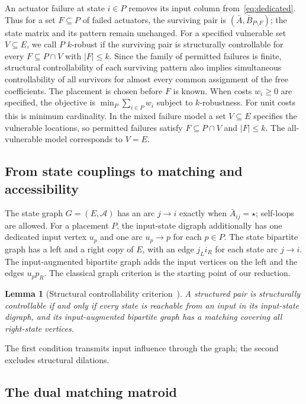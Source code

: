 \documentclass[11pt]{article}
\newtheorem{lemma}[theorem]{Lemma}
\theoremstyle{definition}
\theoremstyle{remark}\newtheorem{remark}[theorem]{Remark}
\begin{document}
An actuator failure at state $i\in P$ removes its input column
from~\eqref{eq:dedicated}. Thus for a set $F\subseteq P$ of
failed actuators, the surviving pair is
$(\bar A,\bar B_{P\setminus F})$; the state matrix and its
pattern remain unchanged. For a specified vulnerable set $V\subseteq E$, we call $P$
$k$-robust if the surviving pair is structurally controllable for
every $F\subseteq P\cap V$ with $|F|\le k$. Since the family of permitted failures is
finite, structural controllability of each surviving pattern
also implies simultaneous controllability of all survivors
for almost every common assignment of the free coefficients.
The placement is chosen before $F$ is known. When costs
$w_i\ge0$ are specified, the objective is
$\min_{P}\sum_{i\in P}w_i$ subject to $k$-robustness.
For unit costs this is minimum cardinality. In the mixed
failure model a set $V\subseteq E$ specifies the vulnerable locations,
so permitted failures satisfy $F\subseteq P\cap V$ and $|F|\le k$.
The all-vulnerable model corresponds to $V=E$.

\subsection{From state couplings to matching and accessibility}
The state graph $G=(E,\mathcal A)$ has an arc $j\to i$
exactly when $\bar A_{ij}=\star$; self-loops are allowed.
For a placement $P$, the input-state digraph additionally
has one dedicated input vertex $u_p$ and one arc $u_p\to p$
for each $p\in P$. The state bipartite graph has a left and a
right copy of $E$, with an edge $j_L i_R$ for each state arc
$j\to i$. The input-augmented bipartite graph adds the input
vertices on the left and the edges $u_p p_R$. The classical graph criterion is the starting point of our reduction.

\begin{lemma}[Structural controllability criterion~\cite{Lin,PKA}]
\label{lem:classical}
A structured pair is structurally controllable if and only if
every state is reachable from an input in its input-state digraph,
and its input-augmented bipartite graph has a matching covering
all right-state vertices.
\end{lemma}

The first condition transmits input influence through the graph;
the second excludes structural dilations.

\subsection{The dual matching matroid}
\end{document}
